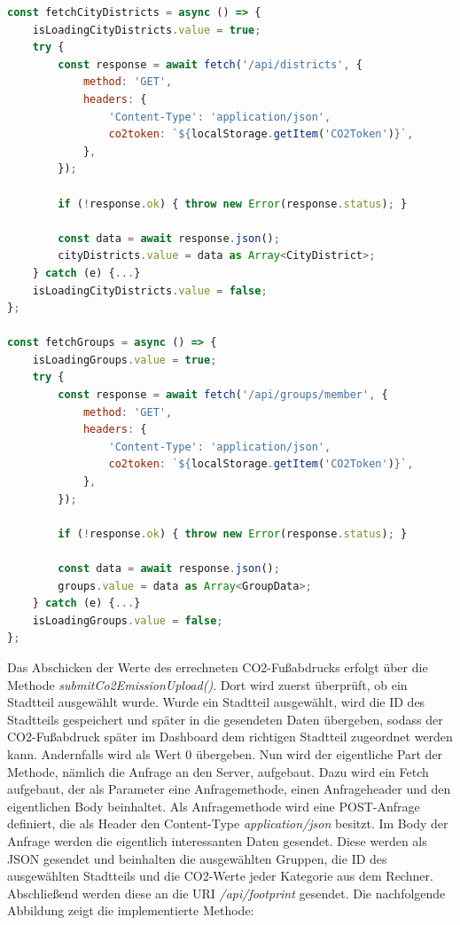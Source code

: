 \begin{lstlisting}[language={JavaScript}, caption={Laden der Stadtteile und Gruppen aus dem Backend}, label={lst:daten-aus-backend}]
const fetchCityDistricts = async () => {
    isLoadingCityDistricts.value = true;
    try {
        const response = await fetch('/api/districts', {
            method: 'GET',
            headers: {
                'Content-Type': 'application/json',
                co2token: `${localStorage.getItem('CO2Token')}`,
            },
        });

        if (!response.ok) { throw new Error(response.status); }

        const data = await response.json();
        cityDistricts.value = data as Array<CityDistrict>;
    } catch (e) {...}
    isLoadingCityDistricts.value = false;
};

const fetchGroups = async () => {
    isLoadingGroups.value = true;
    try {
        const response = await fetch('/api/groups/member', {
            method: 'GET',
            headers: {
                'Content-Type': 'application/json',
                co2token: `${localStorage.getItem('CO2Token')}`,
            },
        });

        if (!response.ok) { throw new Error(response.status); }

        const data = await response.json();
        groups.value = data as Array<GroupData>;
    } catch (e) {...}
    isLoadingGroups.value = false;
};
\end{lstlisting}

Das Abschicken der Werte des errechneten CO2-Fußabdrucks erfolgt über die Methode \textit{submitCo2EmissionUpload()}. Dort wird zuerst überprüft, ob ein Stadtteil ausgewählt wurde. Wurde ein Stadtteil ausgewählt, wird die ID des Stadtteils gespeichert und später in die gesendeten Daten übergeben, sodass der CO2-Fußabdruck später im Dashboard dem richtigen Stadtteil zugeordnet werden kann. Andernfalls wird als Wert 0 übergeben. Nun wird der eigentliche Part der Methode, nämlich die Anfrage an den Server, aufgebaut. Dazu wird ein Fetch aufgebaut, der als Parameter eine Anfragemethode, einen Anfrageheader und den eigentlichen Body beinhaltet. Als Anfragemethode wird eine POST-Anfrage definiert, die als Header den Content-Type \textit{application/json} besitzt. Im Body der Anfrage werden die eigentlich interessanten Daten gesendet. Diese werden als JSON gesendet und beinhalten die ausgewählten Gruppen, die ID des ausgewählten Stadtteils und die CO2-Werte jeder Kategorie aus dem Rechner. Abschließend werden diese an die URI \textit{/api/footprint} gesendet. Die nachfolgende Abbildung zeigt die implementierte Methode:

